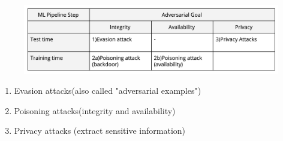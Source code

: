 \documentclass[11pt]{article}
\numberwithin{equation}{section}
\begin{document}
\begin{figure}[!h]
	\centering
	\includegraphics[width=16cm]{figures/attack_tabel.png}
	\label{fig:pie_all}
\end{figure}

\begin{enumerate}
    \item Evasion attacks(also called "adversarial examples")
    \item Poisoning attacks(integrity and availability)
    \item Privacy attacks (extract sensitive information)
\end{enumerate}




% 

\end{document}
